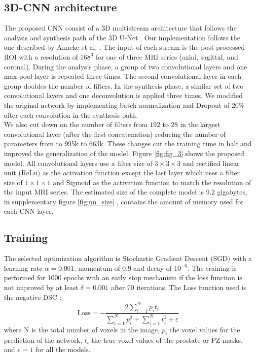\subsection{3D-CNN architecture}
The proposed CNN consist of a 3D multistream architecture that follows the analysis and synthesis path of the 3D U-Net \cite{cciccek20163d}. Our implementation follows the one described by Anneke et al. \cite{anneke}. The input of each stream is the post-processed ROI with a resolution of $168^3$ for one of three MRI series (axial, sagittal, and coronal). During the analysis phase, a group of two convolutional layers and one max pool layer is repeated three times. The second convolutional layer in each group doubles the number of filters.  In the synthesis phase, a similar set of two convolutional layers and one deconvolution is applied three times. We modified the original network by implementing batch normalization \cite{ioffe2015batch} and Dropout of 20\%  \cite{hinton2012improving} after each convolution in the synthesis path.\\

We also cut down on the number of filters from $192$ to $28$ in the largest convolutional layer (after the first concatenation) reducing the number of parameters from to 995k to 663k. These changes cut the training time in half and improved the generalization of the  model. Figure \ref{fig:fig_3} shows the proposed model. All convolutional layers use a filter size of $3 \times 3 \times 3$ and rectified linear unit (ReLu) as the activation function except the last layer which uses a filter size of $1 \times 1 \times 1$ and Sigmoid as the activation function to match the resolution of the input MRI series. The estimated size of the complete model is 9.2 gigabytes, in supplementary figure \ref{fig:nn_size} , contains the amount of memory used for each CNN layer. 

\subsection{Training}
\label{subsec:training}
The selected optimization algorithm is Stochastic Gradient Descent (SGD) with a learning rate $\alpha = 0.001$, momentum of 0.9 and decay of $10^{-6}$. The training is performed for 1000 epochs with an early stop mechanism if the loss function is not improved by at least $\delta = 0.001$ after 70 iterations. The Loss function used is the negative DSC \cite{dice1945measures}:  
\begin{equation}
\text{Loss} = - \frac{2 \sum_{i=1}^{N}p_it_i}{\sum_{i=1}^{N}p_i^2 + \sum_{i=1}^{N}t_i^2 + \varepsilon} 
\label{eq:dsc}
\end{equation}
where N is the total number of voxels in the image, $p_i$ the voxel values for the prediction of the network, $t_i$ the true voxel values of the prostate or PZ masks, and $\varepsilon = 1$ for all the models.

